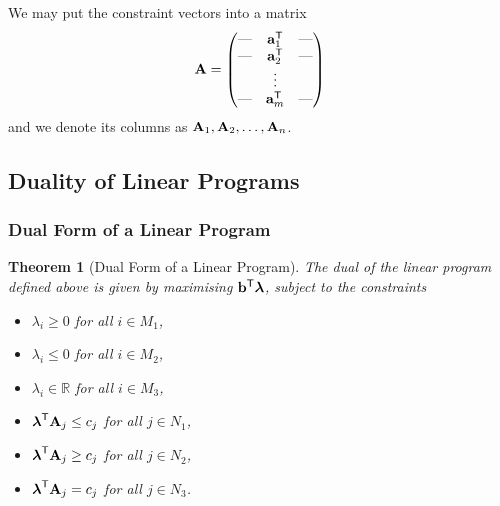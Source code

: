 \documentclass[11pt]{article}
\newtheorem{theorem}{Theorem}[section]
\theoremstyle{definition}
\theoremstyle{remark}
\newcommand{\pmqty}[1]{\begin{pmatrix}#1\end{pmatrix}}
\newcommand{\RR}{\mathbb{R}}
\newcommand{\transpose}{^{\mathsf{T}}}
\begin{document}
We may put the constraint vectors into a matrix
\[
    \vb{A} = \pmqty{
        \text{---} & \vb{a}_1\transpose & \text{---} \\
        \text{---} & \vb{a}_2\transpose & \text{---} \\
         & \vdots & \\
        \text{---} & \vb{a}_m\transpose & \text{---}
    }
\]
and we denote its columns as \(\vb{A}_1, \vb{A}_2, \ldots, \vb{A}_n\).

\subsection{Duality of Linear Programs}

\subsubsection{Dual Form of a Linear Program}

\begin{theorem}[Dual Form of a Linear Program]\label{optim-unit-0042}
    The dual of the linear program defined above is given by maximising \(\vb{b}\transpose \vb*{\lambda}\), subject to the constraints
    \begin{itemize}
        \item \(\lambda_i \geq 0\) for all \(i \in M_1\),
        \item \(\lambda_i \leq 0\) for all \(i \in M_2\),
        \item \(\lambda_i \in \RR\) for all \(i \in M_3\),
        \item \(\vb*{\lambda}\transpose \vb{A}_j \leq c_j\) for all \(j \in N_1\),
        \item \(\vb*{\lambda}\transpose \vb{A}_j \geq c_j\) for all \(j \in N_2\),
        \item \(\vb*{\lambda}\transpose \vb{A}_j = c_j\) for all \(j \in N_3\).
    \end{itemize}
\end{theorem}
\end{document}
